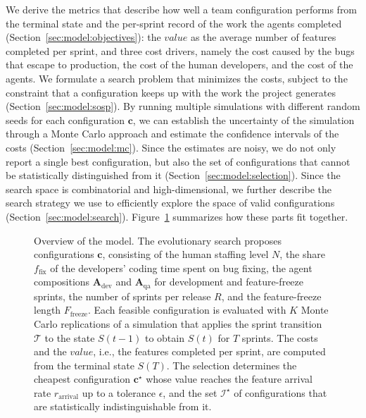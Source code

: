 \documentclass[smallextended]{svjour3}       %
\begin{document}
We derive the metrics that describe how well a team configuration performs from the terminal state and the per-sprint record of the work the agents completed (Section~\ref{sec:model:objectives}): the $value$ as the average number of features completed per sprint, and three cost drivers, namely the cost caused by the bugs that escape to production, the cost of the human developers, and the cost of the agents. We formulate a search problem that minimizes the costs, subject to the constraint that a configuration keeps up with the work the project generates (Section~\ref{sec:model:sosp}). By running multiple simulations with different random seeds for each configuration $\mathbf{c}$, we can establish the uncertainty of the simulation through a Monte Carlo approach and estimate the confidence intervals of the costs (Section~\ref{sec:model:mc}). Since the estimates are noisy, we do not only report a single best configuration, but also the set of configurations that cannot be statistically distinguished from it (Section~\ref{sec:model:selection}). Since the search space is combinatorial and high-dimensional, we further describe the search strategy we use to efficiently explore the space of valid configurations (Section~\ref{sec:model:search}). Figure~\ref{fig:overview} summarizes how these parts fit together.

\begin{figure}[t]
\centering

\caption{Overview of the model. The evolutionary search proposes configurations $\mathbf{c}$, consisting of the human staffing level $N$, the share $f_\mathrm{fix}$ of the developers' coding time spent on bug fixing, the agent compositions $\mathbf{A}_\mathrm{dev}$ and $\mathbf{A}_\mathrm{qa}$ for development and feature-freeze sprints, the number of sprints per release $R$, and the feature-freeze length $F_\mathrm{freeze}$. Each feasible configuration is evaluated with $K$ Monte Carlo replications of a simulation that applies the sprint transition $\mathcal{T}$ to the state $S(t-1)$ to obtain $S(t)$ for $T$ sprints. The costs and the $\mathit{value}$, i.e., the features completed per sprint, are computed from the terminal state $S(T)$. The selection determines the cheapest configuration $\mathbf{c}^\star$ whose value reaches the feature arrival rate $r_\mathrm{arrival}$ up to a tolerance $\epsilon$, and the set $\mathcal{I}^\star$ of configurations that are statistically indistinguishable from it.}
\label{fig:overview}
\end{figure}

\end{document}
